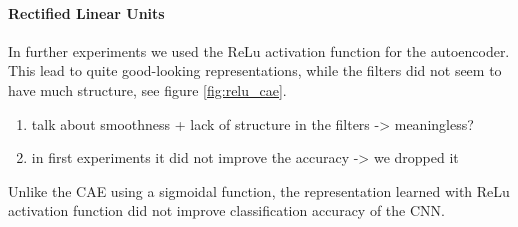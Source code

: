 \documentclass[draft]{article}
\begin{document}
    \paragraph{Rectified Linear Units}
      In further experiments we used the ReLu activation function \citep{nair2010rectified} for the autoencoder.
      This lead to quite good-looking representations, while the filters did not seem to have much structure, see figure \ref{fig:relu_cae}.
      
      \begin{enumerate}
        \item talk about smoothness + lack of structure in the filters -> meaningless?
        \item in first experiments it did not improve the accuracy -> we dropped it
      \end{enumerate}

      Unlike the CAE using a sigmoidal function, the representation learned with ReLu activation function did not improve classification accuracy of the CNN.
\end{document}
